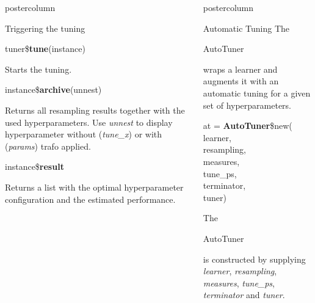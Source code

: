 \documentclass{beamer}
\newlength{\columnheight} %
\newcommand{\codeinline}[1]{\begin{codeboxinline}#1\end{codeboxinline}}
\begin{document}
\begin{frame}[fragile]{}
\begin{columns}
\begin{column}{.245\textwidth}
\begin{beamercolorbox}[center]{postercolumn}
\begin{minipage}{.98\textwidth}
{\begin{myblock}{Triggering the tuning}
\begin{codebox}
								tuner\$\textbf{tune}(instance)
							\end{codebox}
							Starts the tuning.
							\\
							\begin{codebox}
								instance\$\textbf{archive}(unnest)
							\end{codebox}
							Returns all resampling results together with the used hyperparameters. Use \textit{unnest} to display hyperparameter without (\textit{tune\_x}) or with (\textit{params}) trafo applied.
							\\
							\begin{codebox}
								instance\$\textbf{result}
							\end{codebox}
							Returns a list with the optimal hyperparameter configuration and the estimated performance.
						\end{myblock}
						\vfill}
				\end{minipage}
			\end{beamercolorbox}
		\end{column}
		\begin{column}{.245\textwidth}
			\begin{beamercolorbox}[center]{postercolumn}
				\begin{minipage}{.98\textwidth}
					\parbox[t][\columnheight]{\textwidth}{
						\begin{myblock}{Automatic Tuning}
							The \codeinline{AutoTuner} wraps a learner and augments it with an automatic tuning for a given set of hyperparameters.
							\\
							\begin{codeboxmultiline}[width=18cm]
								at = \textbf{AutoTuner}\$new(
								\hspace*{1ex}learner,\\
								\hspace*{1ex}resampling,\\
								\hspace*{1ex}measures,\\
								\hspace*{1ex}tune\_ps,\\
								\hspace*{1ex}terminator,\\
								\hspace*{1ex}tuner)
							\end{codeboxmultiline}
							The \codeinline{AutoTuner} is constructed by supplying \textit{learner}, \textit{resampling}, \textit{measures}, \textit{tune\_ps}, \textit{terminator} and \textit{tuner}.

\end{myblock}}
\end{minipage}
\end{beamercolorbox}
\end{column}
\end{columns}
\end{frame}
\end{document}
